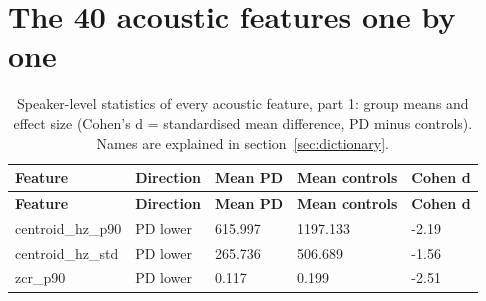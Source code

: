 \documentclass[11pt,a4paper]{article}
\begin{document}
\section{The 40 acoustic features one by one}\label{sec:app-features}
\begin{center}\small\renewcommand{\arraystretch}{1.15}
\begin{longtable}{>{\raggedright\arraybackslash}p{4.20cm}>{\raggedright\arraybackslash}p{2.55cm}>{\raggedleft\arraybackslash}p{2.55cm}>{\raggedleft\arraybackslash}p{2.55cm}>{\raggedleft\arraybackslash}p{2.55cm}}
\caption{Speaker-level statistics of every acoustic feature, part 1: group means and effect size (Cohen's d = standardised mean difference, PD minus controls). Names are explained in section~\ref{sec:dictionary}.}\\
\toprule
\textbf{\hspace{0pt}Feature} & \textbf{\hspace{0pt}Direction} & \textbf{\hspace{0pt}Mean PD} & \textbf{\hspace{0pt}Mean controls} & \textbf{\hspace{0pt}Cohen d}\\\midrule\endfirsthead
\toprule
\textbf{\hspace{0pt}Feature} & \textbf{\hspace{0pt}Direction} & \textbf{\hspace{0pt}Mean PD} & \textbf{\hspace{0pt}Mean controls} & \textbf{\hspace{0pt}Cohen d}\\\midrule\endhead
\bottomrule\endfoot
\hspace{0pt}centroid\_\allowbreak{}hz\_\allowbreak{}p90 & \hspace{0pt}PD lower & \hspace{0pt}615.997 & \hspace{0pt}1197.133 & \hspace{0pt}-2.19\\
\hspace{0pt}centroid\_\allowbreak{}hz\_\allowbreak{}std & \hspace{0pt}PD lower & \hspace{0pt}265.736 & \hspace{0pt}506.689 & \hspace{0pt}-1.56\\
\hspace{0pt}zcr\_\allowbreak{}p90 & \hspace{0pt}PD lower & \hspace{0pt}0.117 & \hspace{0pt}0.199 & \hspace{0pt}-2.51\\

\end{longtable}
\end{center}
\end{document}
